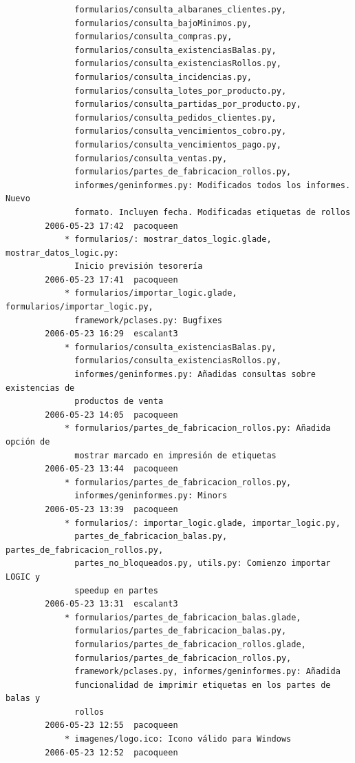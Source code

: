 \documentclass[a4paper]{article}
\begin{document}
\begin{verbatim}
              formularios/consulta_albaranes_clientes.py,
              formularios/consulta_bajoMinimos.py,
              formularios/consulta_compras.py,
              formularios/consulta_existenciasBalas.py,
              formularios/consulta_existenciasRollos.py,
              formularios/consulta_incidencias.py,
              formularios/consulta_lotes_por_producto.py,
              formularios/consulta_partidas_por_producto.py,
              formularios/consulta_pedidos_clientes.py,
              formularios/consulta_vencimientos_cobro.py,
              formularios/consulta_vencimientos_pago.py,
              formularios/consulta_ventas.py,
              formularios/partes_de_fabricacion_rollos.py,
              informes/geninformes.py: Modificados todos los informes. Nuevo
              formato. Incluyen fecha. Modificadas etiquetas de rollos
        2006-05-23 17:42  pacoqueen
            * formularios/: mostrar_datos_logic.glade, mostrar_datos_logic.py:
              Inicio previsión tesorería
        2006-05-23 17:41  pacoqueen
            * formularios/importar_logic.glade, formularios/importar_logic.py,
              framework/pclases.py: Bugfixes
        2006-05-23 16:29  escalant3
            * formularios/consulta_existenciasBalas.py,
              formularios/consulta_existenciasRollos.py,
              informes/geninformes.py: Añadidas consultas sobre existencias de
              productos de venta
        2006-05-23 14:05  pacoqueen
            * formularios/partes_de_fabricacion_rollos.py: Añadida opción de
              mostrar marcado en impresión de etiquetas
        2006-05-23 13:44  pacoqueen
            * formularios/partes_de_fabricacion_rollos.py,
              informes/geninformes.py: Minors
        2006-05-23 13:39  pacoqueen
            * formularios/: importar_logic.glade, importar_logic.py,
              partes_de_fabricacion_balas.py, partes_de_fabricacion_rollos.py,
              partes_no_bloqueados.py, utils.py: Comienzo importar LOGIC y
              speedup en partes
        2006-05-23 13:31  escalant3
            * formularios/partes_de_fabricacion_balas.glade,
              formularios/partes_de_fabricacion_balas.py,
              formularios/partes_de_fabricacion_rollos.glade,
              formularios/partes_de_fabricacion_rollos.py,
              framework/pclases.py, informes/geninformes.py: Añadida
              funcionalidad de imprimir etiquetas en los partes de balas y
              rollos
        2006-05-23 12:55  pacoqueen
            * imagenes/logo.ico: Icono válido para Windows
        2006-05-23 12:52  pacoqueen

\end{verbatim}
\end{document}
